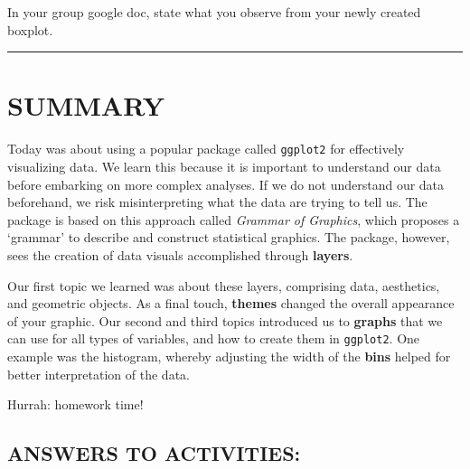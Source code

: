 \documentclass[
]{book}
\begin{document}
In your group google doc, state what you observe from your newly created boxplot.

\begin{center}\rule{0.5\linewidth}{0.5pt}\end{center}

\hypertarget{summary-2}{%
\section{SUMMARY}\label{summary-2}}

Today was about using a popular package called \texttt{ggplot2} for effectively visualizing data. We learn this because it is important to understand our data before embarking on more complex analyses. If we do not understand our data beforehand, we risk misinterpreting what the data are trying to tell us. The package is based on this approach called \emph{Grammar of Graphics}, which proposes a `grammar' to describe and construct statistical graphics. The package, however, sees the creation of data visuals accomplished through \textbf{layers}.

Our first topic we learned was about these layers, comprising data, aesthetics, and geometric objects. As a final touch, \textbf{themes} changed the overall appearance of your graphic. Our second and third topics introduced us to \textbf{graphs} that we can use for all types of variables, and how to create them in \texttt{ggplot2}. One example was the histogram, whereby adjusting the width of the \textbf{bins} helped for better interpretation of the data.

Hurrah: homework time!

\hypertarget{answers-to-activities}{%
\subsection{ANSWERS TO ACTIVITIES:}\label{answers-to-activities}}
\end{document}
